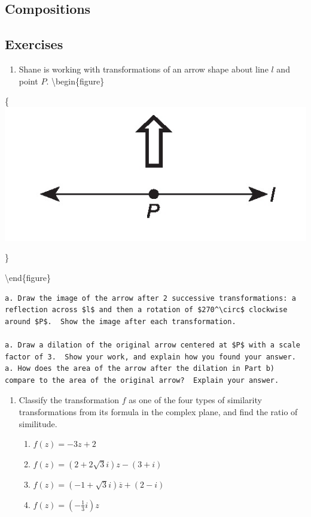 \documentclass[
]{book}
\providecommand{\tightlist}{%
  \setlength{\itemsep}{0pt}\setlength{\parskip}{0pt}}
\theoremstyle{definition}
\theoremstyle{definition}
\theoremstyle{definition}
\theoremstyle{definition}
\theoremstyle{remark}
\begin{document}
\hypertarget{compositions-2}{%
\subsection{Compositions}\label{compositions-2}}

\hypertarget{exercises-57}{%
\subsection{Exercises}\label{exercises-57}}

\begin{enumerate}
\def\labelenumi{\arabic{enumi}.}
\tightlist
\item
  Shane is working with transformations of an arrow shape about line \(l\) and point \(P\).
  \textbackslash begin\{figure\}
\end{enumerate}

\{\centering \includegraphics[width=0.35\linewidth]{images/uparrow}

\}

\textbackslash end\{figure\}

\begin{verbatim}
a. Draw the image of the arrow after 2 successive transformations: a reflection across $l$ and then a rotation of $270^\circ$ clockwise around $P$.  Show the image after each transformation.

a. Draw a dilation of the original arrow centered at $P$ with a scale factor of 3.  Show your work, and explain how you found your answer.
a. How does the area of the arrow after the dilation in Part b) compare to the area of the original arrow?  Explain your answer.
\end{verbatim}

\begin{enumerate}
\def\labelenumi{\arabic{enumi}.}
\item
  Classify the transformation \(f\) as one of the four types of similarity transformations from its formula in the complex plane, and find the ratio of similitude.

  \begin{enumerate}
  \def\labelenumii{\alph{enumii}.}
  \tightlist
  \item
    \({\displaystyle f(z)= -3z+2 }\)
  \item
    \({\displaystyle f(z)= (2+2\sqrt{3}i)z - (3+i)}\)
  \item
    \({\displaystyle f(z)= (-1+\sqrt{3}i)\overline{z} + (2-i)}\)
  \item
    \({\displaystyle f(z)= \left(-\frac{1}{3}i\right)z}\)
  \end{enumerate}
\end{enumerate}
\end{document}
